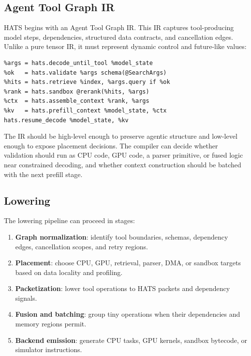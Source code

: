 \documentclass[11pt]{article}
\begin{document}
\subsection{Agent Tool Graph IR}

HATS begins with an Agent Tool Graph IR. This IR captures tool-producing model
steps, dependencies, structured data contracts, and cancellation edges. Unlike a
pure tensor IR, it must represent dynamic control and future-like values:

\begin{lstlisting}
%args = hats.decode_until_tool %model_state
%ok   = hats.validate %args schema(@SearchArgs)
%hits = hats.retrieve %index, %args.query if %ok
%rank = hats.sandbox @rerank(%hits, %args)
%ctx  = hats.assemble_context %rank, %args
%kv   = hats.prefill_context %model_state, %ctx
hats.resume_decode %model_state, %kv
\end{lstlisting}

The IR should be high-level enough to preserve agentic structure and low-level
enough to expose placement decisions. The compiler can decide whether
validation should run as CPU code, GPU code, a parser primitive, or fused logic
near constrained decoding, and whether context construction should be batched
with the next prefill stage.

\subsection{Lowering}

The lowering pipeline can proceed in stages:

\begin{enumerate}[leftmargin=*]
  \item \textbf{Graph normalization}: identify tool boundaries, schemas,
        dependency edges, cancellation scopes, and retry regions.
  \item \textbf{Placement}: choose CPU, GPU, retrieval, parser, DMA, or sandbox
        targets based on data locality and profiling.
  \item \textbf{Packetization}: lower tool operations to HATS packets and
        dependency signals.
  \item \textbf{Fusion and batching}: group tiny operations when their
        dependencies and memory regions permit.
  \item \textbf{Backend emission}: generate CPU tasks, GPU kernels, sandbox
        bytecode, or simulator instructions.
\end{enumerate}
\end{document}
